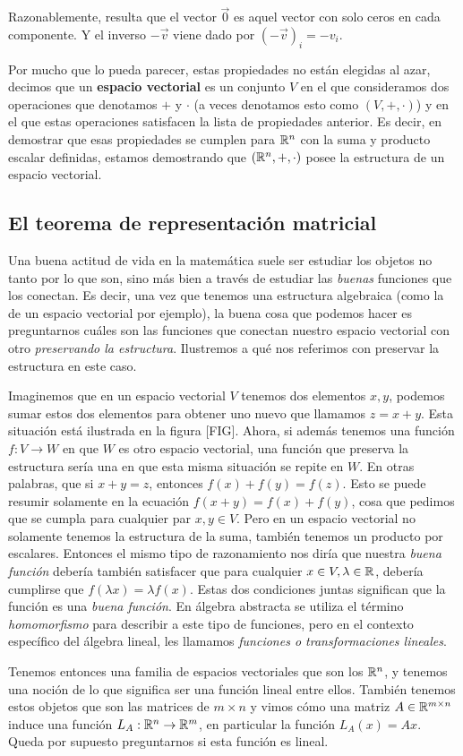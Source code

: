 Razonablemente, resulta que el vector $\vec{0}$ es aquel vector con solo ceros en cada componente. Y el inverso $-\vec{v}$ viene dado por $(-\vec{v})_i = -v_i$.

Por mucho que lo pueda parecer, estas propiedades no están elegidas al azar, decimos que un \textbf{espacio vectorial} es un conjunto $V$ en el que consideramos dos operaciones que denotamos $+$ y $\cdot$ (a veces denotamos esto como $(V, +, \cdot)$) y en el que estas operaciones satisfacen la lista de propiedades anterior. Es decir, en demostrar que esas propiedades se cumplen para $\mathbb{R}^n$ con la suma y producto escalar definidas, estamos demostrando que $(\mathbb{R}^n, +, \cdot)$ posee la estructura de un espacio vectorial.

\subsection{El teorema de representación matricial}

Una buena actitud de vida en la matemática suele ser estudiar los objetos no tanto por lo que son, sino más bien a través de estudiar las \textit{buenas} funciones que los conectan. Es decir, una vez que tenemos una estructura algebraica (como la de un espacio vectorial por ejemplo), la buena cosa que podemos hacer es preguntarnos cuáles son las funciones que conectan nuestro espacio vectorial con otro \textit{preservando la estructura}. Ilustremos a qué nos referimos con preservar la estructura en este caso.

Imaginemos que en un espacio vectorial $V$ tenemos dos elementos $x, y$, podemos sumar estos dos elementos para obtener uno nuevo que llamamos $z = x + y$. Esta situación está ilustrada en la figura [FIG]. Ahora, si además tenemos una función $f: V \to W$ en que $W$ es otro espacio vectorial, una función que preserva la estructura sería una en que esta misma situación se repite en $W$. En otras palabras, que si $x + y = z$, entonces $f(x) + f(y) = f(z)$. Esto se puede resumir solamente en la ecuación $f(x + y) = f(x) + f(y)$, cosa que pedimos que se cumpla para cualquier par $x, y \in V$. Pero en un espacio vectorial no solamente tenemos la estructura de la suma, también tenemos un producto por escalares. Entonces el mismo tipo de razonamiento nos diría que nuestra \textit{buena función} debería también satisfacer que para cualquier $x \in V, \lambda \in \mathbb{R}$, debería cumplirse que $f(\lambda x) = \lambda f(x)$. Estas dos condiciones juntas significan que la función es una \textit{buena función}. En álgebra abstracta se utiliza el término \textit{homomorfismo} para describir a este tipo de funciones, pero en el contexto específico del álgebra lineal, les llamamos \textit{funciones o transformaciones lineales}.

Tenemos entonces una familia de espacios vectoriales que son los $\mathbb{R}^n$, y tenemos una noción de lo que significa ser una función lineal entre ellos. También tenemos estos objetos que son las matrices de $m \times n$ y vimos cómo una matriz $A \in \mathbb{R}^{m \times n}$ induce una función $L_A: \mathbb{R}^n \to \mathbb{R}^m$, en particular la función $L_A (x) = Ax$. Queda por supuesto preguntarnos si esta función es lineal.